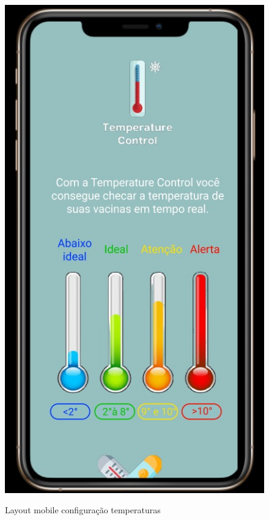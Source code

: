     \begin{figure}[ht]
        \caption{Layout mobile configuração temperaturas}
        \centering
        \includegraphics[scale=0.5]{img/mobile/config_temp.jpeg}
        \label{fig:mobileConfig}
    \end{figure}

